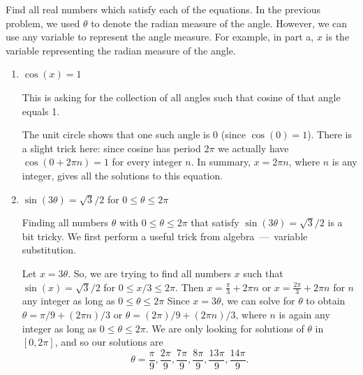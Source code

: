 \documentclass[nooutcomes,handout]{ximera}
\begin{document}
\begin{problem}

  Find all real numbers which satisfy each of the equations.  In the previous problem, we used $\theta$ to denote the radian measure of the angle.  However, we can use any variable to represent the angle measure.  For example, in part a, $x$ is the variable representing the radian measure of the angle.
  \begin{enumerate}
    \item
      $\cos(x) = 1$
      \begin{freeResponse}
        This is asking for the collection of all angles such that cosine of that angle equals 1.

        The unit circle shows that one such angle is $0$ (since $\cos(0) = 1$).
        There is a slight trick here: since cosine has period $2\pi$ we actually have $\cos(0 + 2\pi n) = 1$ for every integer $n$.
        In summary, $x = 2\pi n$, where $n$ is any integer, gives all the solutions to this equation.
      \end{freeResponse}

    \item
      $\sin(3 \theta) = \sqrt{3}/2$ for $0 \leq \theta \leq 2\pi$
      \begin{freeResponse}
        Finding all numbers $\theta$ with $0 \leq \theta \leq 2\pi$ that satisfy $\sin(3 \theta) = \sqrt{3}/2$ is a bit tricky.
        We first perform a useful trick from algebra~---~variable substitution.

        Let $x = 3\theta$.
        So, we are trying to find all numbers $x$ such that $\sin(x) = \sqrt{3}/2$ for $0 \leq x/3 \leq 2\pi$.
        Then $ x= \frac{\pi}{3} + 2 \pi n$ or $ x = \frac{2 \pi }{3} + 2 \pi n $ for $n$ any integer as long as $0 \leq \theta \leq 2\pi$
        Since $x = 3 \theta$, we can solve for $\theta$ to obtain $\theta = \pi/9 + (2 \pi n)/3$ or $\theta = (2\pi)/9 + (2\pi n)/3$, where $n$ is again any integer as long as $0 \leq \theta \leq 2\pi$.
        We are only looking for solutions of $\theta$ in $[0, 2\pi ]$, and so our solutions are
        \[
        \theta = \frac{\pi}{9}, \frac{2\pi}{9}, \frac{7\pi}{9}, \frac{8\pi}{9}, \frac{13\pi}{9}, \frac{14\pi}{9}. 
        \]
      \end{freeResponse}
  \end{enumerate}
\end{problem}
\end{document}
